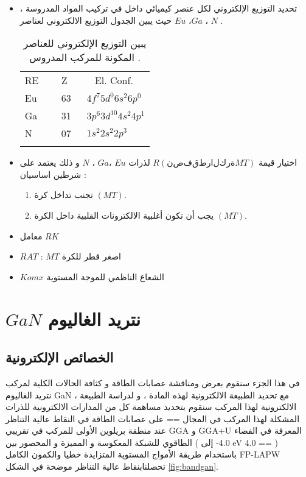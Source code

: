 \begin{itemize}
	\item 
	تحديد التوزيع الإلكتروني لكل عنصر كيميائي داخل في تركيب المواد المدروسة ، حيث يبين الجدول  التوزيع الالكتروني لعناصر $ Eu $  ،$ Ga $ ، $ N $ .
	
	\begin{table}
		\centering
		\begin{tabular}{lll}
			\hline\noalign{\smallskip}
			RE &~~ Z~~ &~ El. Conf. \\
			\noalign{\smallskip}\hline\noalign{\smallskip}
			Eu &~~ 63~ & $ 4f^{7} 5d^{0} 6s^{2} 6p^{0} $ \\
			Ga &~~ 31~ & $ 3p^{6} 3d^{10} 4s^{2} 4p^{1}  $  \\
			N &~~ 07~ & $ 1s^{2} 2s^{2} 2p^{3} $\\
			\noalign{\smallskip}\hline
		\end{tabular}
		\caption{ يبين التوزيع الإلكتروني للعناصر المكونة للمركب المدروس .  }
		\label{tab:1}
	\end{table}

		\item 

		 اختيار قيمة $  R (نصف قطر الكرة MT) $ لذرات $ Eu $  ،$ Ga $ ، $ N $  و ذلك يعتمد على شرطين اساسیان :
		\begin{enumerate}
			\item 
			تجنب تداخل كرة $ (MT) $.
			\item 
			يجب أن تكون أغلبية الالكترونات القلبية داخل الكرة $ (MT) $.

		\end{enumerate}
		
			\item 
			معامل $ RK $ 
				\item 
$ RAT $ : $ MT $ اصغر قطر للكرة 
				
				\item
				 $ Komx $ الشعاع الناظمي للموجة المستوية
\end{itemize}


\section{$ GaN $ نتريد الغاليوم }
\subsection{الخصائص الإلكترونية }

في هذا الجزء سنقوم بعرض ومناقشة عصابات الطاقة و كثافة الحالات الكلية لمركب نتريد الغاليوم GaN ، مع تحديد الطبيعة الالكترونية لهذه المادة ، و لدراسة الطبيعة الالكترونية لهذا المركب سنقوم بتحديد مساهمة كل من المدارات الالكترونية للذرات المشكلة لهذا المركب في المجال == على عصابات الطاقة في النقاط عالية التناظر عند منطقة بريلوين الأولى للمركب في تقريبي GGA و GGA+U المعرفة في الفضاء الطاقوي للشبكة المعكوسة و المميزة و المحصور بين ( 4.0- إلى eV 4.0 == ) 
باستخدام طريقة الأمواج المستوية المتزايدة خطيا والكمون الكامل FP-LAPW تحصلنابنقاط عالية التناظر موضحة في الشكل \ref{fig:bandgan}.

